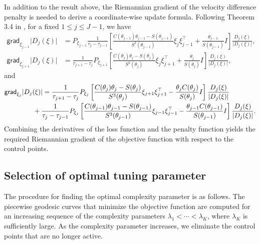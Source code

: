 In addition to the result above, the Riemannian gradient of the velocity difference penalty is needed to derive a coordinate-wise update formula. Following Theorem 3.4 in \citet{bak2023intrinsic},
for a fixed \(1 \le j \le J-1\), we have
\begin{align*}
\textsf{grad}_{\xi_{j-1}} \lvert D_j(\xi) \rvert
&=
P_{\xi_{j-1}}
\frac{1}{\tau_j - \tau_{j-1}} \left[
\frac{C(\theta_{j-1})\theta_{j-1} - S(\theta_{j-1})}{S^3(\theta_{j-1})} \xi_j \xi_{j-1}^\top + \frac{\theta_{j-1}}{S(\theta_{j-1})} I
\right]
\frac{D_j (\xi)}{\lvert D_j (\xi) \rvert},
\\
\textsf{grad}_{\xi_{j+1}} \lvert D_j (\xi) \rvert
&=
\frac{1}{\tau_{j+1} - \tau_j} P_{\xi_{j+1}}
\left[
\frac{C(\theta_j)\theta_j - S(\theta_j)}{S^3(\theta_j)} \xi_j \xi_{j+1}^\top + \frac{\theta_j}{S(\theta_j)} I
\right]
\frac{D_j (\xi)}{\lvert D_j (\xi) \rvert},
\end{align*}
and
\begin{align*}
\textsf{grad}_{\xi_j} \lvert D_j (\xi) \rvert
&=
\frac{1}{\tau_{j+1} - \tau_j} P_{\xi_j} \left[\frac{C(\theta_j)\theta_j - S(\theta_j)}{S^3(\theta_j)} \xi_{j+1} \xi_{j+1}^\top - \frac{\theta_j C(\theta_j)}{S(\theta_j)} I\right]
\frac{D_j (\xi)}{\lvert D_j (\xi) \rvert}
\\
& \hspace{-0.5cm} +
\frac{1}{\tau_j - \tau_{j-1}} P_{\xi_j} \left[
\frac{C(\theta_{j-1}) \theta_{j-1} - S(\theta_{j-1})}{S^3(\theta_{j-1})} \xi_{j-1} \xi_{j-1}^\top - \frac{\theta_{j-1} C(\theta_{j-1})}{S(\theta_{j-1})} I
\right]
\frac{D_j (\xi)}{\lvert D_j (\xi) \rvert}.
\end{align*}
Combining the derivatives of the loss function and the penalty function yields the required Riemannian gradient of the objective function with respect to the control points.

\subsection*{Selection of optimal tuning parameter}\label{selection-of-optimal-tuning-parameter}

The procedure for finding the optimal complexity parameter is as follows. The piecewise geodesic curves that minimize the objective function are computed for an increasing sequence of the complexity parameters
\(\lambda_1 < \cdots < \lambda_K\), where \(\lambda_K\) is sufficiently large. As the complexity parameter increases, we eliminate the control points that are no longer active.

